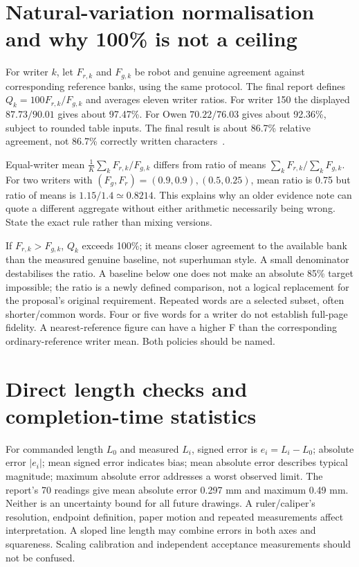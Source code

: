 \section{Natural-variation normalisation and why 100\% is not a ceiling}
For writer $k$, let $F_{r,k}$ and $F_{g,k}$ be robot and genuine agreement
against corresponding reference banks, using the same protocol. The final
report defines $Q_k=100F_{r,k}/F_{g,k}$ and averages eleven writer ratios.
For writer 150 the displayed $87.73/90.01$ gives about 97.47\%.
For Owen $70.22/76.03$ gives about 92.36\%, subject to rounded table inputs.
The final result is about 86.7\% relative agreement, not 86.7\% correctly
written characters~\cite{finalreport2026}.

Equal-writer mean $\frac1K\sum_kF_{r,k}/F_{g,k}$ differs from
ratio of means $\sum_kF_{r,k}/\sum_kF_{g,k}$. For two writers with
$(F_g,F_r)=(0.9,0.9),(0.5,0.25)$, mean ratio is 0.75 but ratio of
means is $1.15/1.4\simeq0.8214$. This explains why an older evidence
note can quote a different aggregate without either arithmetic necessarily
being wrong. State the exact rule rather than mixing versions.

If $F_{r,k}>F_{g,k}$, $Q_k$ exceeds 100\%; it means closer agreement to
the available bank than the measured genuine baseline, not superhuman style.
A small denominator destabilises the ratio. A baseline below one does not
make an absolute 85\% target impossible; the ratio is a newly defined
comparison, not a logical replacement for the proposal's original requirement.
Repeated words are a selected subset, often shorter/common words. Four or
five words for a writer do not establish full-page fidelity. A nearest-reference
figure can have a higher F than the corresponding ordinary-reference writer
mean. Both policies should be named.

\section{Direct length checks and completion-time statistics}
For commanded length $L_0$ and measured $L_i$, signed error is $e_i=L_i-L_0$;
absolute error $|e_i|$; mean signed error indicates bias; mean absolute error
describes typical magnitude; maximum absolute error addresses a worst
observed limit. The report's 70 readings give mean absolute error 0.297 mm
and maximum 0.49 mm. Neither is an uncertainty bound for all future drawings.
A ruler/caliper's resolution, endpoint definition, paper motion and repeated
measurements affect interpretation. A sloped line length may combine errors
in both axes and squareness. Scaling calibration and independent acceptance
measurements should not be confused.

